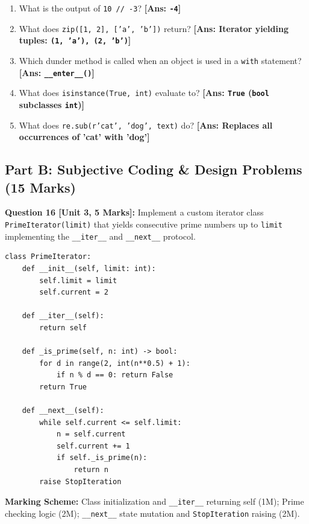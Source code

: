 \begin{enumerate}[label=\textbf{\arabic*.}]
    \item What is the output of \texttt{10 // -3}? \hfill \textbf{[Ans: \texttt{-4}]}
    \item What does \texttt{zip([1, 2], ['a', 'b'])} return? \hfill \textbf{[Ans: Iterator yielding tuples: \texttt{(1, 'a'), (2, 'b')}]}
    \item Which dunder method is called when an object is used in a \texttt{with} statement? \hfill \textbf{[Ans: \texttt{\_\_enter\_\_()}]}
    \item What does \texttt{isinstance(True, int)} evaluate to? \hfill \textbf{[Ans: \texttt{True} (\texttt{bool} subclasses \texttt{int})]}
    \item What does \texttt{re.sub(r'cat', 'dog', text)} do? \hfill \textbf{[Ans: Replaces all occurrences of 'cat' with 'dog']}
\end{enumerate}

\subsection*{Part B: Subjective Coding \& Design Problems (15 Marks)}

\noindent\textbf{Question 16 [Unit 3, 5 Marks]:} Implement a custom iterator class \texttt{PrimeIterator(limit)} that yields consecutive prime numbers up to \texttt{limit} implementing the \texttt{\_\_iter\_\_} and \texttt{\_\_next\_\_} protocol.
\begin{solutionbox}
\begin{lstlisting}
class PrimeIterator:
    def __init__(self, limit: int):
        self.limit = limit
        self.current = 2

    def __iter__(self):
        return self

    def _is_prime(self, n: int) -> bool:
        for d in range(2, int(n**0.5) + 1):
            if n % d == 0: return False
        return True

    def __next__(self):
        while self.current <= self.limit:
            n = self.current
            self.current += 1
            if self._is_prime(n):
                return n
        raise StopIteration
\end{lstlisting}
\end{solutionbox}
\begin{markingrubric}
\textbf{Marking Scheme:} Class initialization and \texttt{\_\_iter\_\_} returning self (1M); Prime checking logic (2M); \texttt{\_\_next\_\_} state mutation and \texttt{StopIteration} raising (2M).
\end{markingrubric}

